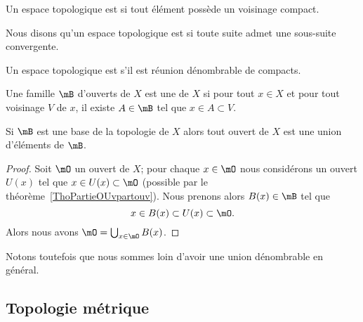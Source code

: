 \begin{definition}  \label{DefEIBYooAWoESf}
    Un espace topologique est  si tout élément possède un voisinage compact.
\end{definition}

\begin{definition}
    Nous disons qu'un espace topologique est  si toute suite admet une sous-suite convergente.
\end{definition}

\begin{definition}      \label{DefFCGBooLpnSAK}
    Un espace topologique est  s'il est réunion dénombrable de compacts.
\end{definition}

\begin{definition}   \label{DefQELfbBEyiB}
    Une famille \( \mB\) d'ouverts de \( X\) est une  de \( X\) si pour tout \( x\in X\) et pour tout voisinage \( V\) de \( x\), il existe \( A\in \mB\) tel que \( x\in A\subset V\).
\end{definition}

\begin{proposition} \label{PropMMKBjgY}
    Si \( \mB\) est une base de la topologie de \( X\) alors tout ouvert de \( X\) est une union d'éléments de \( \mB\).
\end{proposition}

\begin{proof}
    Soit \( \mO\) un ouvert de \( X\); pour chaque \( x\in\mO\) nous considérons un ouvert \( U(x)\) tel que \( x\in U(x)\subset \mO\) (possible par le théorème~\ref{ThoPartieOUvpartouv}). Nous prenons alors \( B(x)\in\mB\) tel que
    \begin{equation}
        x\in B(x)\subset U(x)\subset \mO.
    \end{equation}
    Alors nous avons \( \mO=\bigcup_{x\in \mO}B(x)\).
\end{proof}
Notons toutefois que nous sommes loin d'avoir une union dénombrable en général.

\subsection{Topologie métrique}

